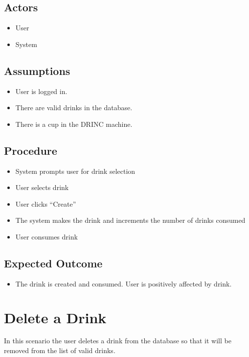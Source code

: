 {        \subsection{Actors}
            \begin{itemize}
                \item User
                \item System
            \end{itemize}
        \subsection{Assumptions}
            \begin{itemize}
                \item User is logged in.
                \item There are valid drinks in the database.
                \item There is a cup in the DRINC machine.
            \end{itemize}
        \subsection{Procedure}
            \begin{itemize}
                \item System prompts user for drink selection
                \item User selects drink
                \item User clicks ``Create''
                \item The system makes the drink and increments the number of
                drinks consumed
                \item User consumes drink
            \end{itemize}
        \subsection{Expected Outcome}
            \begin{itemize}
                \item The drink is created and consumed. User is positively 
                affected by drink.
            \end{itemize}

    \section{Delete a Drink}
        In this scenario the user deletes a drink from the database so that it
        will be removed from the list of valid drinks.
}
